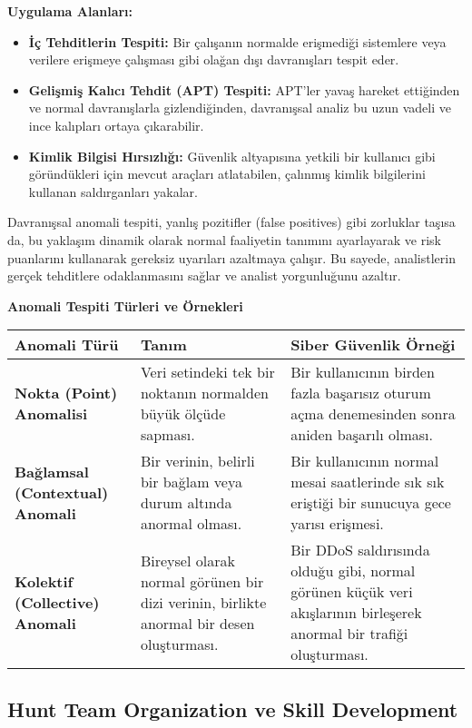 \textbf{Uygulama Alanları:}

\begin{itemize}
    \item \textbf{İç Tehditlerin Tespiti:} Bir çalışanın normalde erişmediği sistemlere veya verilere erişmeye çalışması gibi olağan dışı davranışları tespit eder.
    \item \textbf{Gelişmiş Kalıcı Tehdit (APT) Tespiti:} APT'ler yavaş hareket ettiğinden ve normal davranışlarla gizlendiğinden, davranışsal analiz bu uzun vadeli ve ince kalıpları ortaya çıkarabilir.
    \item \textbf{Kimlik Bilgisi Hırsızlığı:} Güvenlik altyapısına yetkili bir kullanıcı gibi göründükleri için mevcut araçları atlatabilen, çalınmış kimlik bilgilerini kullanan saldırganları yakalar.
\end{itemize}

Davranışsal anomali tespiti, yanlış pozitifler (false positives) gibi zorluklar taşısa da, bu yaklaşım dinamik olarak normal faaliyetin tanımını ayarlayarak ve risk puanlarını kullanarak gereksiz uyarıları azaltmaya çalışır. Bu sayede, analistlerin gerçek tehditlere odaklanmasını sağlar ve analist yorgunluğunu azaltır.

\textbf{Anomali Tespiti Türleri ve Örnekleri}

\begin{tabularx}{\textwidth}{|l|X|X|}
\hline
\textbf{Anomali Türü} & \textbf{Tanım} & \textbf{Siber Güvenlik Örneği} \\
\hline
\textbf{Nokta (Point) Anomalisi} & Veri setindeki tek bir noktanın normalden büyük ölçüde sapması. & Bir kullanıcının birden fazla başarısız oturum açma denemesinden sonra aniden başarılı olması. \\
\hline
\textbf{Bağlamsal (Contextual) Anomali} & Bir verinin, belirli bir bağlam veya durum altında anormal olması. & Bir kullanıcının normal mesai saatlerinde sık sık eriştiği bir sunucuya gece yarısı erişmesi. \\
\hline
\textbf{Kolektif (Collective) Anomali} & Bireysel olarak normal görünen bir dizi verinin, birlikte anormal bir desen oluşturması. & Bir DDoS saldırısında olduğu gibi, normal görünen küçük veri akışlarının birleşerek anormal bir trafiği oluşturması. \\
\hline
\end{tabularx}

\subsection{Hunt Team Organization ve Skill Development}

